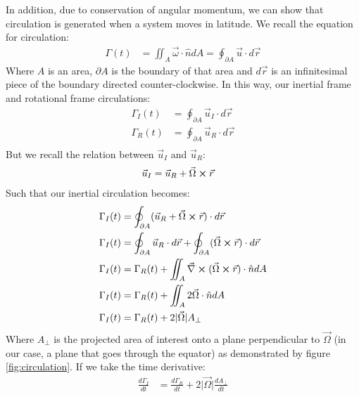 In addition, due to conservation of angular momentum, we can show that circulation is generated when a system moves in latitude. We recall the equation for circulation:
\begin{align}
    \label{eqn:circulation}
    \Gamma (t) &= \iint_A \vec{\omega}\cdot \hat{n}dA = \oint_{\partial A} \vec{u}\cdot d\vec{r}
\end{align}
Where $A$ is an area, $\partial A$ is the boundary of that area and $d\vec{r}$ is an infinitesimal piece of the boundary directed counter-clockwise. In this way, our inertial frame and rotational frame circulations:
\begin{align}
    \label{eqn:incirc}
    \Gamma_I(t) &= \oint_{\partial A} \Vec{u}_I\cdot d\Vec{r}\\
    \Gamma_R(t) &= \oint_{\partial A} \Vec{u}_R\cdot d\Vec{r}\\
\end{align}
But we recall the relation between $\vec{u}_I$ and $\vec{u}_R$:
\begin{align}
    \label{eqn:inertrot}
    \Vec{u}_I &= \Vec{u}_R+\Vec{\Omega}\cross\Vec{r}
\end{align}
Such that our inertial circulation becomes:
\begin{align*}
    \Gamma_I (t) &= \oint_{\partial A} (\Vec{u}_R+\Vec{\Omega}\cross\Vec{r})\cdot d\Vec{r}\\
    \Gamma_I (t) &= \oint_{\partial A} \Vec{u}_R\cdot d\Vec{r}+\oint_{\partial A}(\Vec{\Omega}\cross\vec
    r)\cdot d\Vec{r}\\
    \Gamma_I (t) &= \Gamma_R (t)+ \iint_A \Vec{\nabla}\cross(\Vec{\Omega}\cross\Vec{r})\cdot\hat{n}dA\\
    \Gamma_I (t) &= \Gamma_R (t) +\iint_A 2\Vec{\Omega}\cdot\hat{n}dA\\
    \Gamma_I (t) &= \Gamma_R (t) +2\vert \Vec{\Omega}\vert A_{\perp}
\end{align*}
Where $A_{\perp}$ is the projected area of interest onto a plane perpendicular to $\Vec{\Omega}$ (in our case, a plane that goes through the equator) as demonstrated by figure \ref{fig:circulation}. If we take the time derivative:
\begin{align*}
    \frac{d\Gamma_I}{dt} &= \frac{d\Gamma_R}{dt}+2\vert \Vec{\Omega}\vert \frac{dA_\perp}{dt}
\end{align*}
